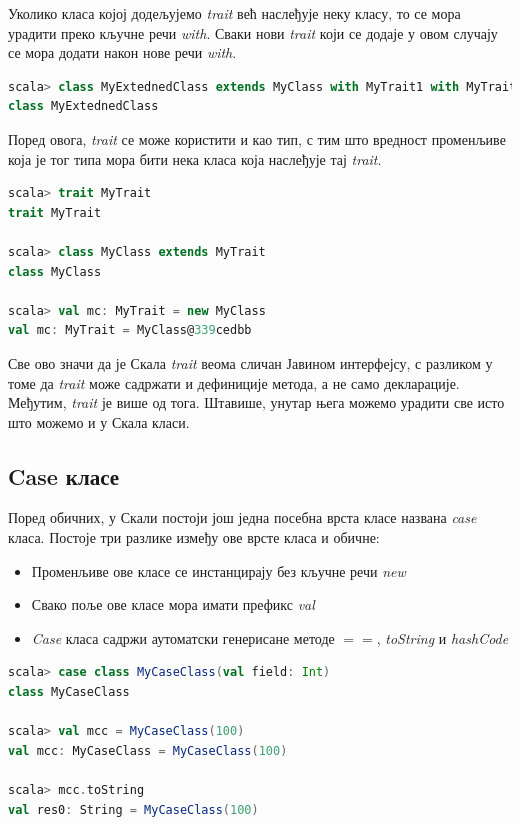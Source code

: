 \documentclass[12pt,oneside]{memoir}
\begin{document}
Уколико класа којој додељујемо \textit{trait} већ наслеђује неку класу, то се мора урадити преко кључне речи \textit{with}. Сваки нови \textit{trait} који се додаје у овом случају се мора додати након нове речи \textit{with}. \cite{scala_prog}

\begin{lstlisting}[language=Scala]
scala> class MyExtednedClass extends MyClass with MyTrait1 with MyTrait2
class MyExtednedClass
\end{lstlisting}

Поред овога, \textit{trait} се може користити и као тип, с тим што вредност променљиве која је тог типа мора бити нека класа која наслеђује тај \textit{trait}.

\begin{lstlisting}[language=Scala]
scala> trait MyTrait
trait MyTrait

scala> class MyClass extends MyTrait
class MyClass

scala> val mc: MyTrait = new MyClass
val mc: MyTrait = MyClass@339cedbb
\end{lstlisting}

Све ово значи да је Скала \textit{trait} веома сличан Јавином интерфејсу, с разликом у томе да \textit{trait} може садржати и дефиниције метода, а не само декларације. Међутим, \textit{trait} је више од тога. Штавише, унутар њега можемо урадити све исто што можемо и у Скала класи.

\subsection{Case класе}
\label{subsec:scala_case_klase}

Поред обичних, у Скали постоји још једна посебна врста класе названа \textit{case} класа. Постоје три разлике између ове врсте класа и обичне:

\begin{itemize}
\item Променљиве ове класе се инстанцирају без кључне речи \textit{new}
\item Свако поље ове класе мора имати префикс \textit{val}
\item \textit{Case} класа садржи аутоматски генерисане методе $==$, \textit{toString} и \textit{hashCode} 
\end{itemize}

\begin{lstlisting}[language=Scala]
scala> case class MyCaseClass(val field: Int)
class MyCaseClass

scala> val mcc = MyCaseClass(100)
val mcc: MyCaseClass = MyCaseClass(100)

scala> mcc.toString
val res0: String = MyCaseClass(100)
\end{lstlisting}
\end{document}
